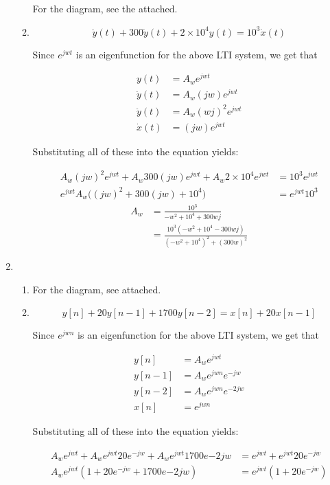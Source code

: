 \documentclass[]{article}
\begin{document}
\begin{enumerate}
\begin{enumerate}
    For the diagram, see the attached.
  \item
    \[
        \ddot{y}(t) + 300\dot{y}(t) + 2 \times 10^4 y(t) = 10^3 \dot{x}(t)
    \]

    Since \(e^{jwt}\) is an eigenfunction for the above LTI system, we
    get that

    \begin{align*}
        y(t) &= A_w e^{jwt} \\
        \dot{y}(t) &= A_w (jw) e^{jwt} \\
        \ddot{y}(t) &= A_w (wj)^2 e^{jwt} \\
        \dot{x}(t) &= (jw) e^{jwt}
    \end{align*}

    Substituting all of these into the equation yields:

    \begin{align*}
        A_w (jw)^2 e^{jwt} + A_w 300 (jw) e^{jwt} + A_w 2 \times 10^4 e^{jwt} &= 
            10^3 e^{jwt} \\
        e^{jwt} A_w \Big( (jw)^2 + 300(jw) + 10^4 \Big) &= e^{jwt} 10^3
    \end{align*}\begin{align*}
        A_w &= \frac{10^3}{-w^2 + 10^4 + 300 w j} \\
            &= \boxed{\frac{10^3 (-w^2 + 10^4 - 300wj)}{ (-w^2 + 10^4)^2 + (300 w)^2}}
    \end{align*}
  \end{enumerate}
\item
  \begin{enumerate}
  \def\labelenumii{\alph{enumii}.}
  \item
    For the diagram, see attached.
  \item
    \[
        y[n] + 20 y[n - 1] + 1700 y[n - 2] = x[n] + 20x[n-1]
    \]

    Since \(e^{jwn}\) is an eigenfunction for the above LTI system, we
    get that

    \begin{align*}
        y[n] &= A_w e^{jwt} \\
        y[n - 1] &= A_w e^{jwn} e^{-jw} \\
        y[n - 2] &= A_w  e^{jwn} e^{-2jw} \\
        x[n] &= e^{jwn}
    \end{align*}

    Substituting all of these into the equation yields:

    \begin{align*}
        A_w e^{jwt} + A_w e^{jwt}20  e^{-jw} + A_w e^{jwt} 1700 e{-2jw} &= 
            e^{jwt} + e^{jwt} 20 e^{-jw} \\
        A_w e^{jwt}(1 +  20  e^{-jw} + 1700 e{-2jw}) &=
            e^{jwt}(1 + 20e^{-jw})
    \end{align*}


\end{enumerate}
\end{enumerate}
\end{document}
